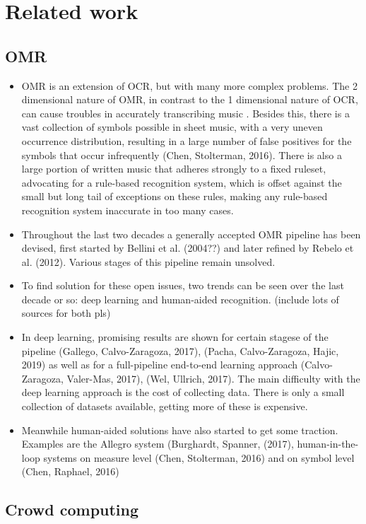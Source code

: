 \chapter{Related work}

\section{OMR}
\begin{itemize}
    \item OMR is an extension of OCR, but with many more complex problems. The 2 dimensional nature of OMR, in contrast to the 1 dimensional nature of OCR, can cause troubles in accurately transcribing music \citeneeded. Besides this, there is a vast collection of symbols possible in sheet music, with a very uneven occurrence distribution, resulting in a large number of false positives for the symbols that occur infrequently (Chen, Stolterman, 2016). There is also a large portion of written music that adheres strongly to a fixed ruleset, advocating for a rule-based recognition system, which is offset against the small but long tail of exceptions on these rules, making any rule-based recognition system inaccurate in too many cases.
    \item Throughout the last two decades a generally accepted OMR pipeline has been devised, first started by Bellini et al. (2004??) and later refined by Rebelo et al. (2012). Various stages of this pipeline remain unsolved.
    \item To find solution for these open issues, two trends can be seen over the last decade or so: deep learning and human-aided recognition. (include lots of sources for both pls)
    \item In deep learning, promising results are shown for certain stagese of the pipeline (Gallego, Calvo-Zaragoza, 2017), (Pacha, Calvo-Zaragoza, Hajic, 2019) as well as for a full-pipeline end-to-end learning approach (Calvo-Zaragoza, Valer-Mas, 2017), (Wel, Ullrich, 2017). The main difficulty with the deep learning approach is the cost of collecting data. There is only a small collection of datasets available, getting more of these is expensive.
    \item Meanwhile human-aided solutions have also started to get some traction. Examples are the Allegro system (Burghardt, Spanner, (2017), human-in-the-loop systems on measure level (Chen, Stolterman, 2016) and on symbol level (Chen, Raphael, 2016)
\end{itemize}

\section{Crowd computing}

